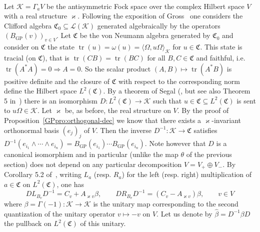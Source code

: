 \documentclass[11pt]{article}
\newcommand{\tmop}[1]{\ensuremath{\operatorname{#1}}}
\begin{document}
\

Let $\mathcal{K}= \Gamma_a V$ be the antisymmetric Fock space over the
complex Hilbert space $V$ with a real structure $\varkappa$. Following the
exposition of Gross~{\cite{gross_existence_1972}} one considers the Clifford
algebra $\mathfrak{C}_0 \subseteq \mathcal{L} (\mathcal{K})$ generated
algebraically by the operators $(B_{\tmop{GP}} (v))_{v \in V}$. Let
$\mathfrak{C}$ be the von Neumann algebra generated by $\mathfrak{C}_0$ and
consider on $\mathfrak{C}$ the state $\tmop{tr} (u) = \omega (u) = \langle
\Omega, u \Omega \rangle_{\mathcal{K}}$ for $u \in \mathfrak{C}$. This state
is tracial (on $\mathfrak{C}$), that is $\tmop{tr} (C B) = \tmop{tr} (B C)$
for all $B, C \in \mathfrak{C}$ and faithful, i.e. $\tmop{tr} (A^{\ast} A) = 0
\Rightarrow A = 0$. So the scalar product $(A, B) \mapsto \tmop{tr} (A^{\ast}
B)$ is positive definite and the closure of $\mathfrak{C}$ with respect to the
corresponding norm define the Hilbert space $L^2 (\mathfrak{C})$. By a theorem
of Segal ({\cite{segal_tensor_1956}}, but see also Theorem 5
in~{\cite{gross_existence_1972}}) there is an isomorphism $D : L^2
(\mathfrak{C}) \rightarrow \mathcal{K}$ such that $u \in \mathfrak{C}
\subseteq L^2 (\mathfrak{C})$ is sent to $u \Omega \in \mathcal{K}$. Let
$\varkappa$ be, as before, the real structure on $V$. By the proof of
Proposition~\ref{GPpro:orthogonal-dec} we know that there exists a
$\varkappa$-invariant orthonormal basis $(e_j)_j$ of $V$. Then the inverse
$D^{- 1} : \mathcal{K} \rightarrow \mathfrak{C}$ satisfies $D^{- 1} (e_{i_1}
\wedge \cdots \wedge e_{i_n}) = B_{\tmop{GP}} (e_{i_1}) \cdots B_{\tmop{GP}}
(e_{i_n})$. Note however that $D$ is a canonical isomorphism and in particular
(unlike the map $\theta$ of the previous section) does not depend on any
particular decomposition $V = V_+ \oplus V_-$. By Corollary 5.2
of~{\cite{gross_existence_1972}}, writing $L_a$ (resp. $R_a$) for the left
(resp. right) multiplication of $a \in \mathfrak{C}$ on $L^2 (\mathfrak{C})$,
one has
\begin{equation}
  D L_{B_v} D^{- 1} = C_v + A_{\varkappa v} \beta, \qquad D R_{B_v} D^{- 1} =
  (C_v - A_{\varkappa v}) \beta, \qquad v \in V \label{eq:maps}
\end{equation}
where $\beta = \Gamma (- 1) : \mathcal{K} \rightarrow \mathcal{K}$ is the
unitary map corresponding to the second quantization of the unitary operator
$v \mapsto - v$ on $V$. Let us denote by $\hat{\beta} = D^{- 1} \beta D$ the
pullback on $L^2 (\mathfrak{C})$ of this unitary.
\end{document}
